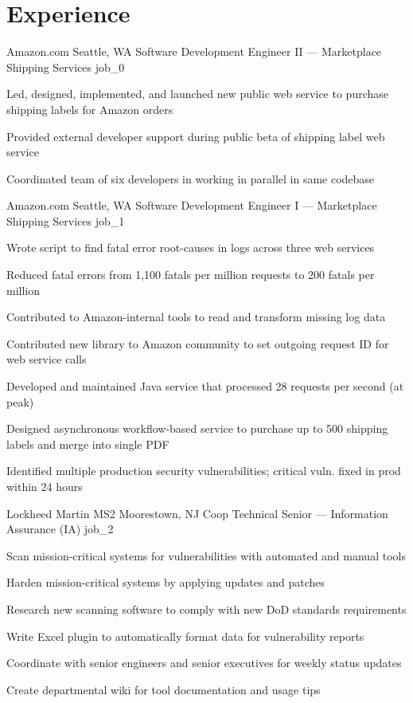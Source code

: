 \documentclass[10pt]{barag_resume}
\author{Sean Barag}
\begin{document}
\section{Experience}\relax
    \renewcommand{\labelitemi}{$\cdot$}\relax %
    \begin{job}{Amazon.com}
        {Seattle, WA}
        {Software Development Engineer II --- Marketplace Shipping Services}
        {job_0}
            \item Led, designed, implemented, and launched new public web service to purchase shipping labels for Amazon orders
            \item Provided external developer support during public beta of shipping label web service
            \item Coordinated team of six developers in working in parallel in same codebase
    \end{job}

    \begin{job}{Amazon.com}
        {Seattle, WA}
        {Software Development Engineer I --- Marketplace Shipping Services}
        {job_1}
            \item Wrote script to find fatal error root-causes in logs across three web services
            \item Reduced fatal errors from 1,100 fatals per million requests to 200 fatals per million
            \item Contributed to Amazon-internal tools to read and transform missing log data
            \item Contributed new library to Amazon community to set outgoing request ID for web service calls
            \item Developed and maintained Java service that processed 28 requests per second (at peak)
            \item Designed asynchronous workflow-based service to purchase up to 500 shipping labels and merge into single PDF
            \item Identified multiple production security vulnerabilities; critical vuln. fixed in prod within 24 hours
    \end{job}

    \begin{job}{Lockheed Martin MS2}
        {Moorestown, NJ}
        {Coop Technical Senior --- Information Assurance (IA)}
        {job_2}
            \item Scan mission-critical systems for vulnerabilities with automated and manual tools
            \item Harden mission-critical systems by applying updates and patches
            \item Research new scanning software to comply with new DoD standards requirements
            \item Write Excel plugin to automatically format data for vulnerability reports
            \item Coordinate with senior engineers and senior executives for weekly status updates
            \item Create departmental wiki for tool documentation and usage tips
    \end{job}
\end{document}

